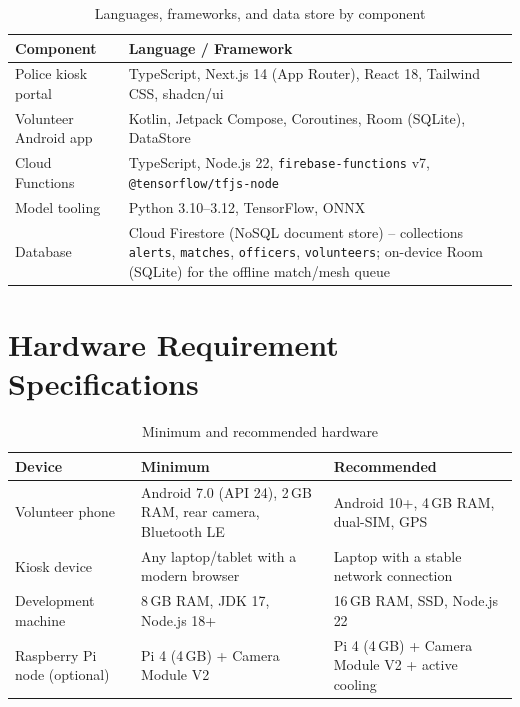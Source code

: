 \documentclass[12pt,a4paper,oneside]{report}
\newcommand{\code}[1]{\texttt{#1}}
\begin{document}
\begin{table}[H]
\centering
\caption{Languages, frameworks, and data store by component}
\begin{tabular}{|p{3.6cm}|p{9.9cm}|}
\hline
\textbf{Component} & \textbf{Language / Framework} \\
\hline
Police kiosk portal & TypeScript, Next.js 14 (App Router), React 18, Tailwind CSS, shadcn/ui \\ \hline
Volunteer Android app & Kotlin, Jetpack Compose, Coroutines, Room (SQLite), DataStore \\ \hline
Cloud Functions & TypeScript, Node.js 22, \code{firebase-functions} v7, \code{@tensorflow/tfjs-node} \\ \hline
Model tooling & Python 3.10--3.12, TensorFlow, ONNX \\ \hline
Database & Cloud Firestore (NoSQL document store) -- collections \code{alerts}, \code{matches}, \code{officers}, \code{volunteers}; on-device Room (SQLite) for the offline match/mesh queue \\
\hline
\end{tabular}
\end{table}

\section{Hardware Requirement Specifications}

\begin{table}[H]
\centering
\caption{Minimum and recommended hardware}
\begin{tabular}{|p{3.6cm}|p{4.6cm}|p{4.6cm}|}
\hline
\textbf{Device} & \textbf{Minimum} & \textbf{Recommended} \\
\hline
Volunteer phone & Android 7.0 (API 24), 2\,GB RAM, rear camera, Bluetooth LE & Android 10+, 4\,GB RAM, dual-SIM, GPS \\ \hline
Kiosk device & Any laptop/tablet with a modern browser & Laptop with a stable network connection \\ \hline
Development machine & 8\,GB RAM, JDK 17, Node.js 18+ & 16\,GB RAM, SSD, Node.js 22 \\ \hline
Raspberry Pi node (optional) & Pi 4 (4\,GB) + Camera Module V2 & Pi 4 (4\,GB) + Camera Module V2 + active cooling \\
\hline
\end{tabular}
\end{table}

\end{document}
